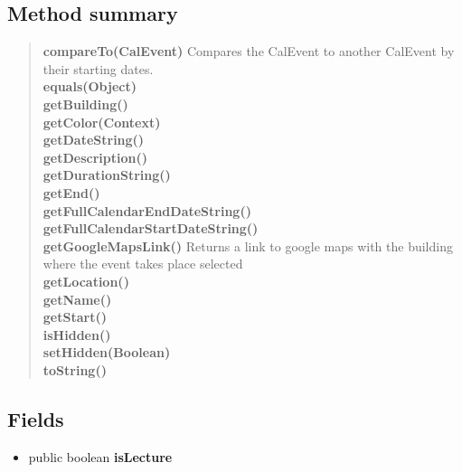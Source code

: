 \documentclass[11pt,a4paper]{report}
\begin{document}
{{\subsection{Method summary}{
\begin{verse}
{\bf compareTo(CalEvent)} Compares the CalEvent to another CalEvent by their starting dates.\\
{\bf equals(Object)} \\
{\bf getBuilding()} \\
{\bf getColor(Context)} \\
{\bf getDateString()} \\
{\bf getDescription()} \\
{\bf getDurationString()} \\
{\bf getEnd()} \\
{\bf getFullCalendarEndDateString()} \\
{\bf getFullCalendarStartDateString()} \\
{\bf getGoogleMapsLink()} Returns a link to google maps with the building where the event takes place selected\\
{\bf getLocation()} \\
{\bf getName()} \\
{\bf getStart()} \\
{\bf isHidden()} \\
{\bf setHidden(Boolean)} \\
{\bf toString()} \\
\end{verse}
}
\subsection{Fields}{
\begin{itemize}
\item{
\label{is.mpg.ruglan.data.CalEvent.isLecture}public boolean {\bf  isLecture}}
\end{itemize}
}
}}
\end{document}
